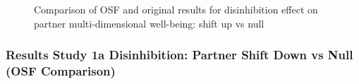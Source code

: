 \documentclass[
  singlecolumn]{article}
\begin{document}
\begin{figure}


\caption{\label{fig-results-disinhibition-partner-up-comparison}Comparison
of OSF and original results for disinhibition effect on partner
multi-dimensional well-being: shift up vs null}

\end{figure}%

\newpage{}

\subsubsection{Results Study 1a Disinhibition: Partner Shift Down vs
Null (OSF
Comparison)}\label{results-study-1a-disinhibition-partner-shift-down-vs-null-osf-comparison}
\end{document}
